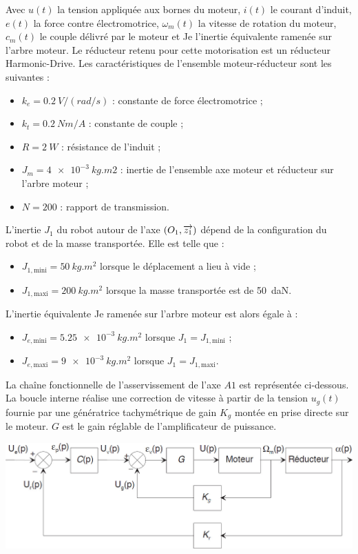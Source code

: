 \documentclass[10pt,fleqn]{article} %
\begin{document}
\begin{multicols}{2}
Avec  $u(t)$  la  tension  appliquée  aux  bornes  du moteur,  $i(t)$  le  courant  d’induit,  $e(t)$  la  force 
contre  électromotrice, $\omega_m(t)$  la  vitesse  de  rotation  du moteur,  $c_m(t)$  le  couple  délivré  par  le 
moteur et Je l’inertie équivalente ramenée sur l’arbre moteur. 
Le  réducteur  retenu  pour  cette  motorisation  est  un  réducteur  Harmonic-Drive.  Les 
caractéristiques de l’ensemble moteur-réducteur sont les suivantes : 
\begin{itemize}
\item $k_e = \SI{0,2}{V/(rad/s)}$ : constante de force électromotrice ; 
\item $k_t = \SI{0,2}{Nm/A}$ : constante de couple ; 
\item $R = \SI{2}{W}$ : résistance de l’induit ; 
\item $J_m = \SI{4e-3}{kg.m2}$ : inertie de l’ensemble axe moteur et réducteur sur l'arbre moteur ; 
\item $N = 200$ : rapport de transmission.
\end{itemize} 
L’inertie $J_1$ du robot autour de l’axe $\left(O_1,\overrightarrow{z_1}\right)$ dépend de la configuration du robot et de la masse 
transportée. Elle est telle que : 
\begin{itemize}
\item $J_{1,\text{mini}} = \SI{50}{kg.m^2}$ lorsque le déplacement a lieu à vide ; 
\item $J_{1,\text{maxi}} = \SI{200}{kg.m^2}$ lorsque la masse transportée est de \SI{50}{daN}.
\end{itemize}

L’inertie équivalente Je ramenée sur l’arbre moteur est alors égale à : 
\begin{itemize}
\item $J_{e,\text{mini}} = \SI{5,25e-3}{kg.m^2}$ lorsque $J_1=J_{1,\text{mini}}$ ; 
\item $J_{e,\text{maxi}} =\SI{9e-3}{kg.m^2}$ lorsque $J_1=J_{1,\text{maxi}}$.
\end{itemize}

La chaîne fonctionnelle de l’asservissement de l’axe $A1$ est représentée ci-dessous. La boucle interne réalise une correction de vitesse à partir de la tension $u_g(t)$ fournie par une 
génératrice  tachymétrique  de  gain $K_g$ montée  en  prise  directe  sur  le moteur. $G$  est  le  gain 
réglable de l’amplificateur de puissance. 

\begin{center}
\includegraphics[width=\linewidth]{images/fig_02}
\end{center}


\end{multicols}
\end{document}

